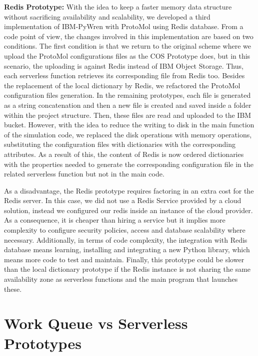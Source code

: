\documentclass[sigplan, screen]{acmart}
\begin{document}
\vspace{2mm}
\noindent
\textbf{Redis Prototype:}
With the idea to keep a faster memory data structure without sacrificing availability and scalability, we developed a third implementation of IBM-PyWren with ProtoMol using Redis database\cite{redis}. From a code point of view, the changes involved in this implementation are based on two conditions. The first condition is that we return to the original scheme where we upload the ProtoMol configurations files as the COS Prototype does, but in this scenario, the uploading is against Redis instead of IBM Object Storage. Thus,  each serverless function retrieves its corresponding file from Redis too.
Besides the replacement of the local dictionary by Redis, we refactored the ProtoMol configuration files generation. In the remaining prototypes, each file is generated as a string concatenation and then a new file is created and saved inside a folder within the project structure. Then, these files are read and uploaded to the IBM bucket. However, with the idea to reduce the writing to disk in the main function of the  simulation code,  we replaced the disk operations with memory operations, substituting the configuration files with dictionaries with the corresponding attributes. As a result of this, the content of Redis is now ordered dictionaries with the properties needed to generate the corresponding configuration file in the related serverless function but not in the main code.

As a disadvantage, the Redis prototype requires factoring in an extra cost for the Redis server. In this case, we did not use a Redis Service provided by a cloud solution, instead we configured our redis inside an instance of the cloud provider. As a consequence, it is cheaper than hiring a service but it implies more complexity to configure security policies, access and database scalability where necessary. Additionally, in terms of code complexity, the integration with Redis database means learning, installing and integrating a new Python library, which means more code to test and maintain.  Finally, this prototype could be slower than the local dictionary prototype if the Redis instance is not sharing the same availability zone as serverless functions and the main program that launches these.

\section{Work Queue vs Serverless Prototypes}
\end{document}
